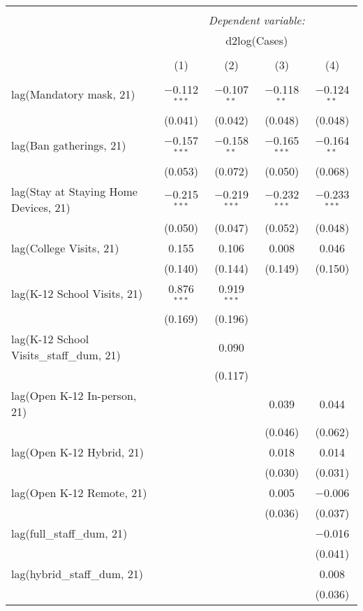 \begin{tabular}{@{\extracolsep{1pt}}lcccc} 
\\[-1.8ex]\hline 
\hline \\[-1.8ex] 
 & \multicolumn{4}{c}{\textit{Dependent variable:}} \\ 
\cline{2-5} 
 & \multicolumn{4}{c}{d2log(Cases)} \\ 
\\[-1.8ex] & (1) & (2) & (3) & (4)\\ 
\hline \\[-1.8ex] 
 lag(Mandatory mask, 21) & $-$0.112$^{***}$ & $-$0.107$^{**}$ & $-$0.118$^{**}$ & $-$0.124$^{**}$ \\ 
  & (0.041) & (0.042) & (0.048) & (0.048) \\ 
  lag(Ban gatherings, 21) & $-$0.157$^{***}$ & $-$0.158$^{**}$ & $-$0.165$^{***}$ & $-$0.164$^{**}$ \\ 
  & (0.053) & (0.072) & (0.050) & (0.068) \\ 
  lag(Stay at Staying Home Devices, 21) & $-$0.215$^{***}$ & $-$0.219$^{***}$ & $-$0.232$^{***}$ & $-$0.233$^{***}$ \\ 
  & (0.050) & (0.047) & (0.052) & (0.048) \\ 
  lag(College Visits, 21) & 0.155 & 0.106 & 0.008 & 0.046 \\ 
  & (0.140) & (0.144) & (0.149) & (0.150) \\ 
  lag(K-12 School Visits, 21) & 0.876$^{***}$ & 0.919$^{***}$ &  &  \\ 
  & (0.169) & (0.196) &  &  \\ 
  lag(K-12 School Visits\_staff\_dum, 21) &  & 0.090 &  &  \\ 
  &  & (0.117) &  &  \\ 
  lag(Open K-12 In-person, 21) &  &  & 0.039 & 0.044 \\ 
  &  &  & (0.046) & (0.062) \\ 
  lag(Open K-12 Hybrid, 21) &  &  & 0.018 & 0.014 \\ 
  &  &  & (0.030) & (0.031) \\ 
  lag(Open K-12 Remote, 21) &  &  & 0.005 & $-$0.006 \\ 
  &  &  & (0.036) & (0.037) \\ 
  lag(full\_staff\_dum, 21) &  &  &  & $-$0.016 \\ 
  &  &  &  & (0.041) \\ 
  lag(hybrid\_staff\_dum, 21) &  &  &  & 0.008 \\ 
  &  &  &  & (0.036) \\ 

\end{tabular}
